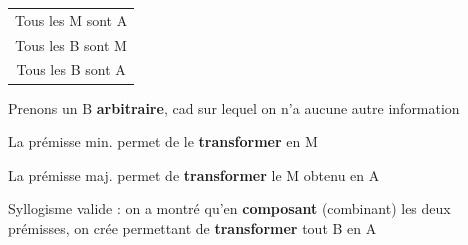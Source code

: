 \begin{frame}
	
	\begin{description}[labelindent=6pt,style=multiline,leftmargin=1.3in]
		 \setlength\itemsep{1em}

\item[Mode + figure] \begin{tabular}{c}
Tous les M sont A\\ 
Tous les B sont M\\ 
\cline{1-1}
Tous les B sont A
\end{tabular} \newline
	\end{description}
	
	 
Prenons un B \textbf{arbitraire}, cad sur lequel on n'a aucune autre information \pause \newline 

La prémisse min. permet de le \textbf{transformer} en M\pause \newline

La prémisse maj. permet de \textbf{transformer} le M obtenu en A \pause \newline

Syllogisme valide \pause : on a montré qu'en \textbf{composant} (combinant) les deux prémisses, on crée  permettant de \textbf{transformer} tout B en A \pause

\end{frame}


%
%	
%
%
%



